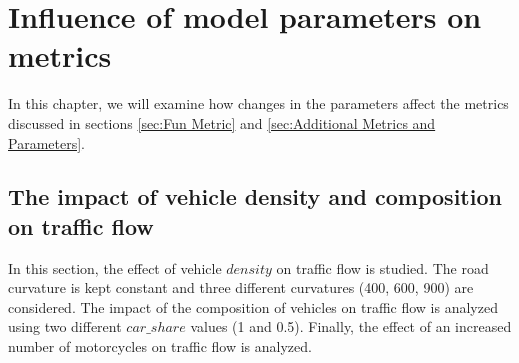 \chapter{Influence of model parameters on metrics}
\label{chapter:Influence of model parameters on metrics}

In this chapter, we will examine how changes in the parameters affect the metrics discussed in sections \ref{sec:Fun Metric} and \ref{sec:Additional Metrics and Parameters}.

\section{The impact of vehicle density and composition on traffic flow}
\label{sec:The impact of vehicle density and composition on traffic flow}
In this section, the effect of vehicle $density$ on traffic flow is studied. The road curvature is kept constant and three different curvatures (400, 600, 900) are considered. The impact of the composition of vehicles on traffic flow is analyzed using two different $car\_share$ values (1 and 0.5). Finally, the effect of an increased number of motorcycles on traffic flow is analyzed.

